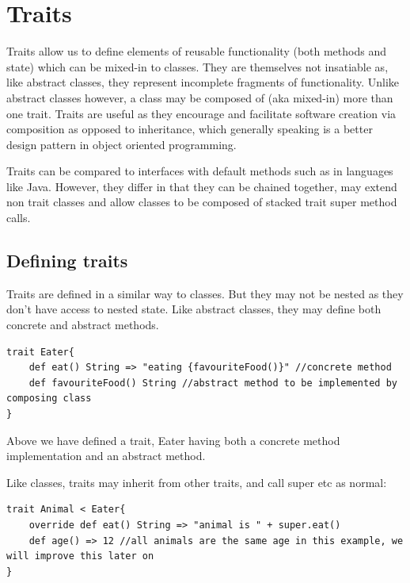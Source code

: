 \documentclass[conc-doc]{subfiles}
\begin{document}
	
	\chapter[Traits]{Traits}



Traits allow us to define elements of reusable functionality (both methods and state) which can be mixed-in to classes. They are themselves not insatiable as, like abstract classes, they represent incomplete fragments of functionality. Unlike abstract classes however, a class may be composed of (aka mixed-in) more than one trait. Traits are useful as they encourage and facilitate software creation via composition as opposed to inheritance, which generally speaking is a better design pattern in object oriented programming.

Traits can be compared to interfaces with default methods such as in languages like Java. However, they differ in that they can be chained together, may extend non trait classes and allow classes to be composed of stacked trait super method calls.

\section{Defining traits}
Traits are defined in a similar way to classes. But they may not be nested as they don't have access to nested state. Like abstract classes, they may define both concrete and abstract methods.
\begin{lstlisting}
trait Eater{
	def eat() String => "eating {favouriteFood()}" //concrete method
	def favouriteFood() String //abstract method to be implemented by composing class
}
\end{lstlisting}

Above we have defined a trait, Eater having both a concrete method implementation and an abstract method.

Like classes, traits may inherit from other traits, and call super etc as normal:
\begin{lstlisting}
trait Animal < Eater{
	override def eat() String => "animal is " + super.eat()
	def age() => 12 //all animals are the same age in this example, we will improve this later on
}
\end{lstlisting}
\end{document}
